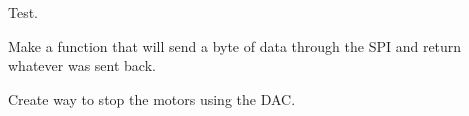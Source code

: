 \begin{DoxyRefList}
\item[\label{todo__todo000027}%
\hypertarget{todo__todo000027}{}%
Global \hyperlink{timer_8c_a6c16a31642845dad0390aa67d2462f40}{set\-Timer\-Interrupt} (unsigned char timer, Callback callback)]Test.  
\item[\label{todo__todo000024}%
\hypertarget{todo__todo000024}{}%
Global \hyperlink{_s_p_i_8h_a4d2cd713b65091a59a9a2ee50b28bdf1}{spi\-Transceive} (B\-Y\-T\-E data)]Make a function that will send a byte of data through the S\-P\-I and return whatever was sent back.  
\item[\label{todo__todo000005}%
\hypertarget{todo__todo000005}{}%
Global \hyperlink{motors_8h_a5260da8b51f5d97f6cf2a9ba11d1aee1}{stop\-Motors} ()]Create way to stop the motors using the D\-A\-C. 
\end{DoxyRefList}